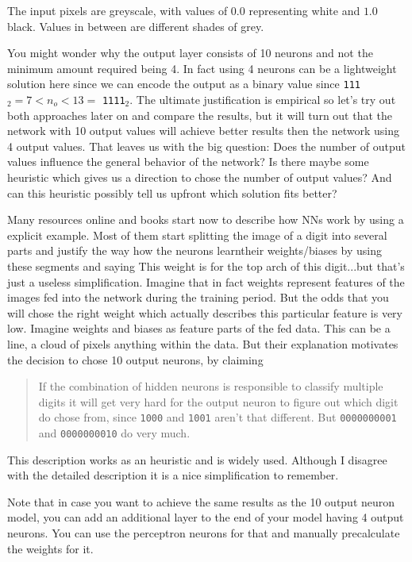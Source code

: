 \documentclass[10pt]{book}
\begin{document}
    The input pixels are greyscale, with values of \(0.0\) representing white and \(1.0\) black. Values in between are different shades of grey.

    You might wonder why the output layer consists of 10 neurons and not the minimum amount required being 4. In fact using 4 neurons can be a lightweight solution
    here since we can encode the output as a binary value since \lstinline{111}\({}_2=7< n_o <13=\) \lstinline{1111}\({}_2\). The ultimate justification is empirical
    so let's try out both approaches later on and compare the results, but it will turn out that the network with 10 output values will achieve better results then the 
    network using 4 output values. That leaves us with the big question: Does the number of output values influence the general behavior of the network?
    Is there maybe some heuristic which gives us a direction to chose the number of output values?
    And can this heuristic possibly tell us upfront which solution fits better?

    Many resources online and books start now to describe how NNs work by using a explicit example. Most of them start splitting the image of a
    digit into several parts and justify the way how the neurons \dq learn\dq their weights/biases by using these segments and saying \dq This weight is for the top arch of this digit...\dq but
    that's just a useless simplification. Imagine that in fact weights represent features of the images fed into the network during the training period. But the odds that you will chose the right weight
    which actually describes this particular feature is very low. Imagine weights and biases as feature parts of the fed data. This can be a line, a cloud of pixels anything within the data.
    But their explanation motivates the decision to chose 10 output neurons, by claiming
    \begin{quote}
        If the combination of hidden neurons is responsible to classify multiple digits it will get very hard for the output neuron to figure out
        which digit do chose from, since \lstinline{1000} and \lstinline{1001} aren't that different. But \lstinline{0000000001} and \lstinline{0000000010} do very much.
    \end{quote}
    This description works as an heuristic and is widely used. Although I disagree with the detailed description it is a nice simplification to remember.

    Note that in case you want to achieve the same results as the 10 output neuron model, you can add an additional layer to the end of your model having 4 output neurons.
    You can use the perceptron neurons for that and manually precalculate the weights for it.
\end{document}
